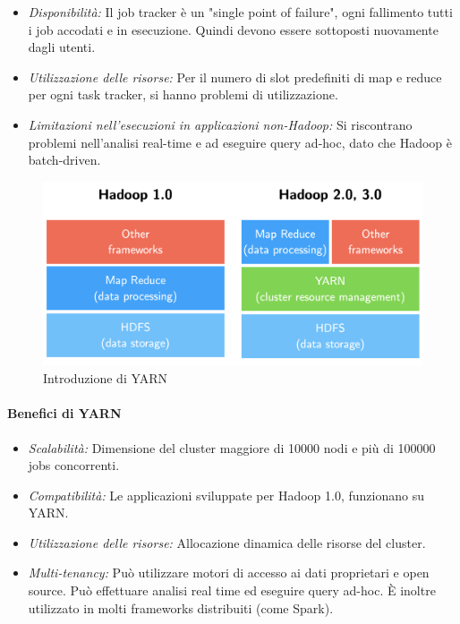\documentclass{article}
\begin{document}
\begin{appendices}
\begin{itemize}
    \item \textit{Disponibilità:} Il job tracker è un "single point of failure", ogni fallimento tutti i job accodati e in esecuzione. Quindi devono essere sottoposti nuovamente dagli utenti.
    \item \textit{Utilizzazione delle risorse:} Per il numero di slot predefiniti di map e reduce per ogni task tracker, si hanno problemi di utilizzazione.
    \item \textit{Limitazioni nell'esecuzioni in applicazioni non-Hadoop:} Si riscontrano problemi nell'analisi real-time e ad eseguire query ad-hoc, dato che Hadoop è batch-driven.
\end{itemize}

\begin{figure}[H]
    \centering
    \includegraphics[scale=0.3]{img/YARN.png}
    \caption{Introduzione di YARN}
\end{figure}\noindent

\paragraph{Benefici di YARN}
\begin{itemize}
    \item \textit{Scalabilità:} Dimensione del cluster maggiore di 10000 nodi e più di 100000 jobs concorrenti.
    \item \textit{Compatibilità:} Le applicazioni sviluppate per Hadoop 1.0, funzionano su YARN.
    \item \textit{Utilizzazione delle risorse:} Allocazione dinamica delle risorse del cluster.
    \item \textit{Multi-tenancy:} Può utilizzare motori di accesso ai dati proprietari e open source. Può effettuare analisi real time ed eseguire query ad-hoc. È inoltre utilizzato in molti frameworks distribuiti (come Spark).
\end{itemize}


\end{appendices}
\end{document}

